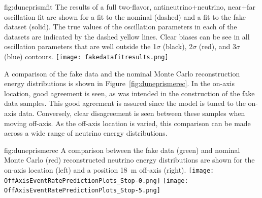 \begin{dunefigure}{fig:duneprismfit}
{The results of a full two-flavor, antineutrino+neutrino, near+far oscillation fit are shown for a fit to the nominal  (dashed) and a fit to the fake dataset (solid). The true values of the oscillation parameters in each of the datasets are indicated by the dashed yellow lines. Clear biases can be see in all oscillation parameters that are well outside the 1$\sigma$ (black), 2$\sigma$ (red), and 3$\sigma$ (blue) contours.}
      \texttt{[image: fakedatafitresults.png]}
\end{dunefigure}

A comparison of the fake data and the nominal Monte Carlo reconstruction energy distributions is shown in Figure~\ref{fig:duneprismerec}. In the on-axis location, good agreement is seen, as was intended in the construction of the fake data samples. This good agreement is assured since the model is tuned to the on-axis data.  Conversely, clear disagreement is seen between these samples when moving off-axis. As the off-axis location is varied, this comparison can be made across a wide range of neutrino energy distributions.

\begin{dunefigure}{fig:duneprismerec}
{A comparison between the fake data (green) and nominal Monte Carlo (red) reconstructed neutrino energy distributions are shown for the on-axis   location (left) and a position \SI{18}{m} off-axis (right).}
      \texttt{[image: OffAxisEventRatePredictionPlots\_Stop-0.png]}
      \texttt{[image: OffAxisEventRatePredictionPlots\_Stop-5.png]}
\end{dunefigure}

